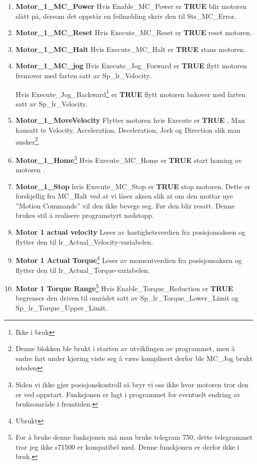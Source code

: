 \documentclass{ol-softwaremanual}
\newcommand{\true}{\textbf{TRUE} }
\begin{document}
\begin{enumerate}[label= \textbf{Network \arabic*:}]
    \item \textbf{ Motor\_1\_MC\_Power} Hvis Enable\_MC\_Power er \true blir motoren slått på, dersom det oppstår en feilmelding skriv den til Sts\_MC\_Error.
    \item \textbf{ Motor\_1\_MC\_Reset} Hvis Execute\_MC\_Reset er \true reset motoren.
    \item \textbf{ Motor\_1\_MC\_Halt} Hvis Execute\_MC\_Halt er  \true stans motoren.
    \item \textbf{ Motor\_1\_MC\_jog} Hvis Execute\_Jog\_Forward er  \true flytt motoren  fremover med farten satt av Sp\_lr\_Velocity. 
    
    Hvis {Execute\_Jog\_Backward\footnote{Ikke i bruk}} er  \true flytt motoren  bakover med farten satt av Sp\_lr\_Velocity. 
    \item \textbf{ Motor\_1\_MoveVelocity} Flytter motoren hvis Execute er  \true, Man kansatt te  Velocity, Acceleration, Deceleration, Jerk og  Direction slik man ønsker\footnote{Denne blokken ble brukt i starten av utviklingen av programmet, men å endre fart under kjøring viste seg å være komplisert derfor ble MC\_Jog brukt isteden}.  
    \item \textbf{Motor\_1\_Home}\footnote{Siden vi ikke gjør posisjonskontroll så bryr vi oss ikke hvor motoren tror den er ved oppstart. Funksjonen er lagt i programmet for eventuelt endring av bruksområde i fremtiden.} Hvis Execute\_MC\_Home er  \true start homing av motoren .
    \item \textbf{Motor\_1\_Stop} hvis Execute\_MC\_Stop er  \true stop motoren, Dette er forskjellig fra MC\_Halt ved at vi låser aksen slik at om den mottar nye ''Motion Commands'' vil den ikke bevege seg. Før den blir resatt. Denne brukes stil å realisere programstyrt nødstopp.
    \item \textbf{Motor 1 actual velocity} Leser av hastighetsverdien fra posisjonsaksen og flytter den til lr\_Actual\_Velocity-variabelen.
    \item \textbf{Motor 1 Actual Torque}\footnote{Ubrukt} Leser av momentverdien fra posisjonsaksen og flytter den til lr\_Actual\_Torque-variabelen.
    \item \textbf{Motor 1 Torque Range}\footnote{For å bruke denne funksjonen må man bruke telegram 750, dette telegrammet tror jeg ikke \Gls{s71500} er kompatibel med. Denne funskjonen er derfor ikke i bruk.}  Hvis Enable\_Torque\_Reduction er  \true begrenser den driven til området satt av  Sp\_lr\_Torque\_Lower\_Limit og Sp\_lr\_Torque\_Upper\_Limit.

\end{enumerate}
\end{document}
